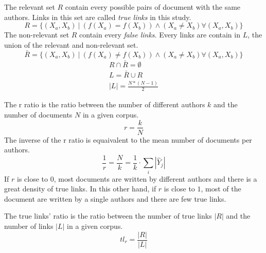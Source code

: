 \begin{definition}
  The relevant set $R$ contain every possible pairs of document with the same authors.
  Links in this set are called \textit{true links} in this study.
  \begin{equation}
    \label{def:relevant_set}
    R = \{(X_a, X_b)\ |\ \left( f(X_a) = f(X_b) \right) \land \left(X_a \neq X_b \right) \forall (X_a, X_b)\}
  \end{equation}
  The non-relevant set $R$ contain every \textit{false links}.
  Every links are contain in $L$, the union of the relevant and non-relevant set.
  \begin{equation}
    \bar{R} = \{(X_a, X_b)\ |\ \left( f(X_a) \neq f(X_b) \right) \land \left(X_a \neq X_b \right) \forall (X_a, X_b)\}
  \end{equation}
  \begin{gather}
    R \cap \bar{R} = \emptyset \\
    L = \bar{R} \cup R \\
    |L| = \frac{N * (N-1)}{2}
  \end{gather}
\end{definition}

\begin{definition}
  The r ratio is the ratio between the number of different authors $k$ and the number of documents $N$ in a given corpus.
  \begin{equation}
    r = \frac{k}{N}
  \end{equation}
  The inverse of the r ratio is equaivalent to the mean number of documents per authors.
  \begin{equation}
    \frac{1}{r} = \frac{N}{k} = \frac{1}{k} \cdot \sum_{i} |\hat{Y}_j|
  \end{equation}
  If $r$ is close to $0$, most documents are written by different authors and there is a great density of true links.
  In this other hand, if $r$ is close to $1$, most of the document are written by a single authors and there are few true links.
\end{definition}

\begin{definition}
  The true links' ratio is the ratio between the number of true links $|R|$ and the number of links $|L|$ in a given corpus.
  \begin{equation}
    tl_r = \frac{|R|}{|L|}
  \end{equation}
\end{definition}
